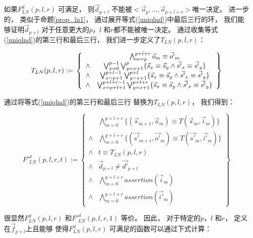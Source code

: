 如果$F^d_{LN}(p,l,r)$ 可满足，
则$\vec{d}_{p+l}$ 不能被$<\vec{o}_p,\dots,\vec{o}_{p+l+r}>$唯一决定。
进一步的，
类似于命题\ref{prop_ln1}，
通过展开等式(\ref{uniqlnd})中最后三行的环，
我们能够证明$\vec{d}_{p+l}$ 对于任意更大的$p$，$l$ 和$r$都不能被唯一决定。
通过收集等式(\ref{uniqlnd})的第三行和最后三行，
我们进一步定义了$T_{LN}(p,l,r)$：

\begin{equation}\label{tln}
T_{LN}(p,l,r):=\\
\left\{
\begin{array}{cc}
      &\bigwedge_{m=p}^{p+l+r}\vec{o}_m\equiv \vec{o'}_m \\
\wedge&\bigvee_{x=0}^{p-1}\bigvee_{y=x+1}^{p} \{\vec{s}_x\equiv \vec{s}_y\wedge \vec{s'}_x\equiv \vec{s'}_y\} \\
\wedge&\bigvee_{x=p+1}^{p+l-1}\bigvee_{y=x+1}^{p+l} \{\vec{s}_x\equiv \vec{s}_y\wedge \vec{s'}_x\equiv \vec{s'}_y\} \\
\wedge&\bigvee_{x=p+l+1}^{p+l+r-1}\bigvee_{y=x+1}^{p+l+r} \{\vec{s}_x\equiv \vec{s}_y\wedge \vec{s'}_x\equiv \vec{s'}_y\}
\end{array}
\right\}
\end{equation}

通过将等式(\ref{uniqlnd})的第三行和最后三行 替换为$T_{LN}(p,l,r)$，
我们得到：

\begin{equation}\label{lndef1}
F'^d_{LN}(p,l,r,t):=
\left\{
\begin{array}{cc}
&\bigwedge_{m=0}^{p+l+r}
\{
(\vec{s}_{m+1},\vec{o}_m)\equiv T(\vec{s}_m,\vec{i}_m)
\}
\\
\wedge&\bigwedge_{m=0}^{p+l+r}
\{
(\vec{s'}_{m+1},\vec{o'}_m)\equiv T(\vec{s'}_m,\vec{i'}_m)
\}
\\
\wedge& t\equiv T_{LN}(p,l,r)\\
\wedge& \vec{d}_{p+l}\ne \vec{d'}_{p+l} \\
\wedge&\bigwedge_{m=0}^{p+l+r}assertion(\vec{i}_m) \\
\wedge&\bigwedge_{m=0}^{p+l+r}assertion(\vec{i'}_m)
\end{array}
\right\}
\end{equation}

很显然$F^d_{LN}(p,l,r)$ 和$F'^d_{LN}(p,l,r,1)$ 等价。
因此，
对于特定的$p$，$l$ 和$r$，
定义在$\vec{f}_{p+l}$上且能够 使得$F^d_{LN}(p,l,r)$ 可满足的函数可以通过下式计算：

